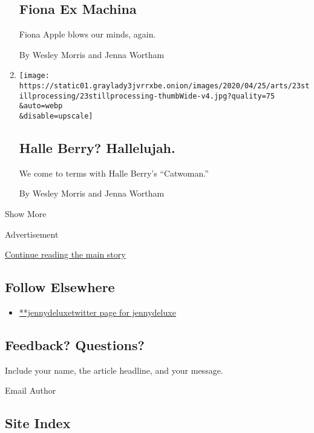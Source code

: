 \begin{enumerate}
  \hypertarget{fiona-ex-machina}{%
  \subsection{Fiona Ex Machina}\label{fiona-ex-machina}}

  Fiona Apple blows our minds, again.

  By Wesley Morris and Jenna Wortham
\item
  \href{/2020/04/23/podcasts/still-processing-halle-berry-sharon-stone-catwoman-quarantine.html}{}

  \texttt{[image: https://static01.graylady3jvrrxbe.onion/images/2020/04/25/arts/23stillprocessing/23stillprocessing-thumbWide-v4.jpg?quality=75\\\&auto=webp\\\&disable=upscale]}

  \hypertarget{halle-berry-hallelujah}{%
  \subsection{Halle Berry? Hallelujah.}\label{halle-berry-hallelujah}}

  We come to terms with Halle Berry's ``Catwoman.''

  By Wesley Morris and Jenna Wortham
\end{enumerate}

Show More

Advertisement

\protect\hyperlink{after-mid2}{Continue reading the main story}

\hypertarget{follow-elsewhere}{%
\subsection{Follow Elsewhere}\label{follow-elsewhere}}

\begin{itemize}
\tightlist
\item
  \href{https://twitter.com/jennydeluxe}{**jennydeluxetwitter page for
  jennydeluxe}
\end{itemize}

\hypertarget{feedback-questions}{%
\subsection{Feedback? Questions?}\label{feedback-questions}}

Include your name, the article headline, and your message.

Email Author

\hypertarget{site-index}{%
\subsection{Site Index}\label{site-index}}

